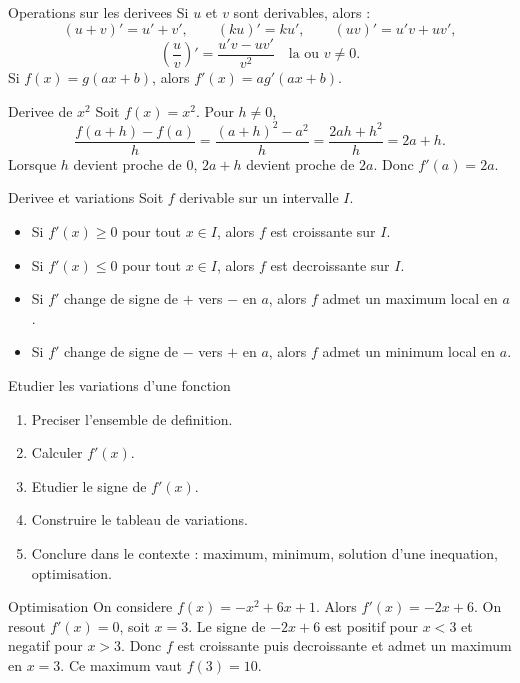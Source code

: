 \documentclass[11pt,a4paper]{article}
\begin{document}
\begin{boitecours}{Operations sur les derivees}
Si $u$ et $v$ sont derivables, alors :
\[
(u+v)'=u'+v',\qquad (ku)'=ku',\qquad (uv)'=u'v+uv',
\]
\[
\left(\frac uv\right)'=\frac{u'v-uv'}{v^2}\quad\text{la ou }v\ne0.
\]
Si $f(x)=g(ax+b)$, alors $f'(x)=a g'(ax+b)$.
\end{boitecours}

\begin{boitepreuve}{Derivee de $x^2$}
Soit $f(x)=x^2$. Pour $h\ne0$,
\[
\frac{f(a+h)-f(a)}{h}=\frac{(a+h)^2-a^2}{h}=\frac{2ah+h^2}{h}=2a+h.
\]
Lorsque $h$ devient proche de $0$, $2a+h$ devient proche de $2a$. Donc $f'(a)=2a$.
\end{boitepreuve}

\begin{boitecours}{Derivee et variations}
Soit $f$ derivable sur un intervalle $I$.
\begin{itemize}
  \item Si $f'(x)\ge0$ pour tout $x\in I$, alors $f$ est croissante sur $I$.
  \item Si $f'(x)\le0$ pour tout $x\in I$, alors $f$ est decroissante sur $I$.
  \item Si $f'$ change de signe de $+$ vers $-$ en $a$, alors $f$ admet un maximum local en $a$.
  \item Si $f'$ change de signe de $-$ vers $+$ en $a$, alors $f$ admet un minimum local en $a$.
\end{itemize}
\end{boitecours}

\begin{boitemethode}{Etudier les variations d'une fonction}
\begin{enumerate}
  \item Preciser l'ensemble de definition.
  \item Calculer $f'(x)$.
  \item Etudier le signe de $f'(x)$.
  \item Construire le tableau de variations.
  \item Conclure dans le contexte : maximum, minimum, solution d'une inequation, optimisation.
\end{enumerate}
\end{boitemethode}

\begin{boiteexemple}{Optimisation}
On considere $f(x)=-x^2+6x+1$. Alors $f'(x)=-2x+6$. On resout $f'(x)=0$, soit $x=3$. Le signe de $-2x+6$ est positif pour $x<3$ et negatif pour $x>3$. Donc $f$ est croissante puis decroissante et admet un maximum en $x=3$. Ce maximum vaut $f(3)=10$.
\end{boiteexemple}
\end{document}
